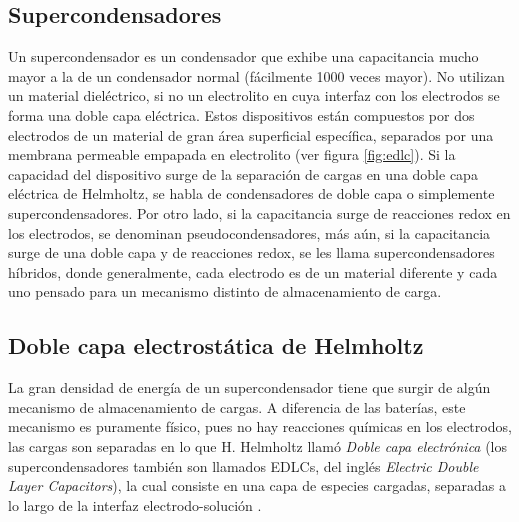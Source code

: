 %

\subsection{Supercondensadores}
Un supercondensador es un condensador que exhibe una capacitancia mucho mayor a la de un condensador normal (fácilmente 1000 veces mayor). No utilizan un material dieléctrico, si no un electrolito en cuya interfaz con los electrodos se forma una doble capa eléctrica. Estos dispositivos están compuestos por dos electrodos de un material de gran área superficial específica, separados por una membrana permeable empapada en electrolito (ver figura \ref{fig:edlc}). Si la capacidad del dispositivo surge de la separación de cargas en una doble capa eléctrica de Helmholtz, se habla de condensadores de doble capa o simplemente supercondensadores. Por otro lado, si la capacitancia surge de reacciones redox en los electrodos, se denominan pseudocondensadores, más aún, si la capacitancia surge de una doble capa y de reacciones redox, se  les llama supercondensadores híbridos, donde generalmente, cada electrodo es de un material diferente y cada uno pensado para un mecanismo distinto de almacenamiento de carga.

\subsection{Doble capa electrostática de Helmholtz}
La gran densidad de energía de un supercondensador tiene que surgir de algún mecanismo de almacenamiento de cargas. A diferencia de las baterías, este mecanismo es puramente físico, pues no hay reacciones químicas en los electrodos, las cargas son separadas en lo que H. Helmholtz llamó \emph{Doble capa electrónica} (los supercondensadores también son llamados EDLCs, del inglés \emph{Electric Double Layer Capacitors}), la cual consiste en una capa de especies cargadas, separadas a lo largo de la interfaz electrodo-solución \citep{Frackowiak2001}. 


